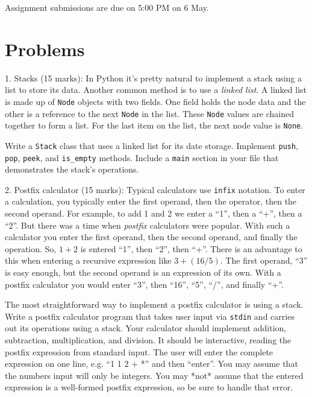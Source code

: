 \documentclass{article}
\begin{document}
Assignment submissions are due on 5:00 PM on 6 May.


\section*{Problems}

1. Stacks (15 marks): In Python it's pretty natural to implement a stack using a list to store its data. Another common method is to use a \emph{linked list}. A linked list is made up of \texttt{Node} objects with two fields. One field holds the node data and the other is a reference to the next \texttt{Node} in the list. These \texttt{Node} values are chained together to form a list. For the last item on the list, the next node value is \texttt{None}.

Write a \texttt{Stack} class that uses a linked list for its date storage. Implement \texttt{push}, \texttt{pop}, \texttt{peek}, and \texttt{is\_empty} methods. Include a \texttt{main} section in your file that demonstrates the stack's operations.

\vspace{3mm}
2. Postfix calculator (15 marks): Typical calculators use \texttt{infix} notation. To enter a calculation, you typically enter the first operand, then the operator, then the second operand. For example, to add 1 and 2 we enter a ``1'', then a ``+'', then a ``2''. But there was a time when \emph{postfix} calculators were popular. With such a calculator you enter the first operand, then the second operand, and finally the operation. So, $1 + 2$ is entered ``1'', then ``2'', then ``+''. There is an advantage to this when entering a recursive expression like $3 + (16 / 5)$. The first operand, ``3'' is easy enough, but the second operand is an expression of its own. With a postfix calculator you would enter ``3'', then ``16'', ``5'', ``/'', and finally ``+''.

The most straightforward way to implement a postfix calculator is using a stack. Write a postfix calculator program that takes user input via \texttt{stdin} and carries out its operations using a stack. Your calculator should implement addition, subtraction, multiplication, and division.
It should be interactive, reading the postfix expression from standard input. The user will enter the complete expression on one line, e.g. ``1 1 2 + *'' and then ``enter''. You may assume that the numbers input will only be integers. You may *not* assume that the entered expression is a well-formed postfix expression, so be sure to handle that error.
\end{document}
